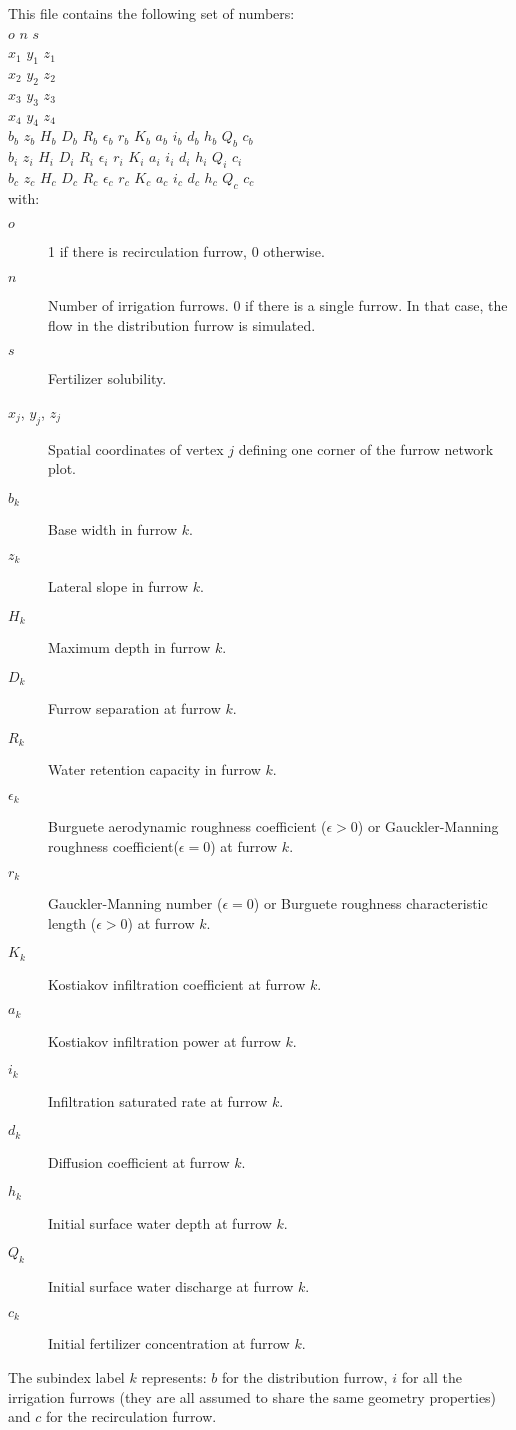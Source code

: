 This file contains the following set of numbers:\\
$o$ $n$ $s$\\
$x_1$ $y_1$ $z_1$\\
$x_2$ $y_2$ $z_2$\\
$x_3$ $y_3$ $z_3$\\
$x_4$ $y_4$ $z_4$\\
$b_b$ $z_b$ $H_b$ $D_b$ $R_b$ $\epsilon_b$ $r_b$ $K_b$ $a_b$ $i_b$ $d_b$
	$h_b$ $Q_b$ $c_b$\\
$b_i$ $z_i$ $H_i$ $D_i$ $R_i$ $\epsilon_i$ $r_i$ $K_i$ $a_i$ $i_i$ $d_i$
	$h_i$ $Q_i$ $c_i$\\
$b_c$ $z_c$ $H_c$ $D_c$ $R_c$ $\epsilon_c$ $r_c$ $K_c$ $a_c$ $i_c$ $d_c$
	$h_c$ $Q_c$ $c_c$\\
with:
\begin{description}
\item[$o$] 1 if there is recirculation furrow, 0 otherwise.
\item[$n$] Number of irrigation furrows. 0 if there is a single furrow. 
           In that case, the flow in the distribution furrow is simulated.
\item[$s$] Fertilizer solubility.
\item[$x_j$, $y_j$, $z_j$] Spatial coordinates of vertex $j$ defining one corner of the 
	furrow network plot.  
\item[$b_k$] Base width in furrow $k$.
\item[$z_k$] Lateral slope in furrow $k$.
\item[$H_k$] Maximum depth in furrow $k$.
\item[$D_k$] Furrow separation at furrow $k$.
\item[$R_k$] Water retention capacity in furrow $k$.
\item[$\epsilon_k$] Burguete aerodynamic roughness coefficient ($\epsilon>0$) or Gauckler-Manning 
            roughness coefficient($\epsilon=0$) at furrow $k$.
\item[$r_k$] Gauckler-Manning number ($\epsilon=0$) or Burguete roughness characteristic length
            ($\epsilon>0$) at furrow $k$.
\item[$K_k$] Kostiakov infiltration coefficient at furrow $k$.
\item[$a_k$] Kostiakov infiltration power at furrow $k$.
\item[$i_k$] Infiltration saturated rate at furrow $k$.
\item[$d_k$] Diffusion coefficient at furrow $k$.
\item[$h_k$] Initial surface water depth at furrow $k$.
\item[$Q_k$] Initial surface water discharge at furrow $k$.
\item[$c_k$] Initial fertilizer concentration at furrow $k$.
\end{description}
The subindex label $k$ represents: $b$ for the distribution furrow, $i$ for all the irrigation furrows 
(they are all assumed to share the same geometry properties) and $c$ for the recirculation furrow.

